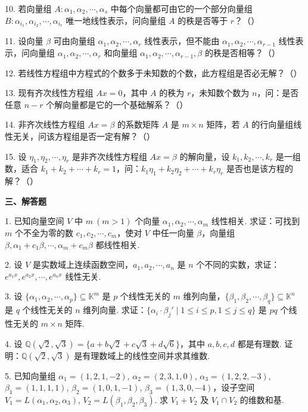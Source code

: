 \documentclass[UTF8,12pt,a4paper,fontset=fandol]{ctexart}
\begin{document}
10. 若向量组 $A:\alpha_1,\alpha_2,\cdots,\alpha_s$ 中每个向量都可由它的一个部分向量组 $B:\alpha_{i_1},\alpha_{i_2},\cdots,\alpha_{i_r}$ 唯一地线性表示，问向量组 $A$ 的秩是否等于 $r$？（\quad）

11. 设向量 $\beta$ 可由向量组 $\alpha_1,\alpha_2,\cdots,\alpha_r$ 线性表示，但不能由 $\alpha_1,\alpha_2,\cdots,\alpha_{r-1}$ 线性表示，问向量组 $\alpha_1,\alpha_2,\cdots,\alpha_r$ 和向量组 $\alpha_1,\alpha_2,\cdots,\alpha_{r-1},\beta$ 的秩是否相等？（\quad）

12. 若线性方程组中方程式的个数多于未知数的个数，此方程组是否必无解？（\quad）

13. 现有齐次线性方程组 $Ax=0$，其中 $A$ 的秩为 $r$，未知数个数为 $n$，问：是否任意 $n-r$ 个解向量都是它的一个基础解系？（\quad）

14. 非齐次线性方程组 $Ax=\beta$ 的系数矩阵 $A$ 是 $m\times n$ 矩阵，若 $A$ 的行向量组线性无关，问该方程组是否一定有解？（\quad）

15. 设 $\eta_1,\eta_2,\cdots,\eta_r$ 是非齐次线性方程组 $Ax=\beta$ 的解向量，设 $k_1,k_2,\cdots,k_r$ 是一组数，适合 $k_1+k_2+\cdots+k_r=1$，问：$k_1\eta_1+k_2\eta_2+\cdots+k_r\eta_r$ 是否也是该方程的解？（\quad）

\noindent\textbf{三、解答题}

1. 已知向量空间 $V$ 中 $m\ (m>1)$ 个向量 $\alpha_1,\alpha_2,\cdots,\alpha_m$ 线性相关. 求证：可找到 $m$ 个不全为零的数 $c_1,c_2,\cdots,c_m$，使对 $V$ 中任一向量 $\beta$，向量组 $\beta,\alpha_1+c_1\beta,\cdots,\alpha_m+c_m\beta$ 都线性相关.

2. 设 $V$ 是实数域上连续函数空间，$a_1,a_2,\cdots,a_n$ 是 $n$ 个不同的实数，求证：$e^{a_1x},e^{a_2x},\cdots,e^{a_nx}$ 线性无关.

3. 设 $\{\alpha_1,\alpha_2,\cdots,\alpha_p\}\subseteq\mathbb{K}^m$ 是 $p$ 个线性无关的 $m$ 维列向量，$\{\beta_1,\beta_2,\cdots,\beta_q\}\subseteq\mathbb{K}^n$ 是 $q$ 个线性无关的 $n$ 维列向量. 求证：$\{\alpha_i\cdot\beta_j'\mid 1\le i\le p,1\le j\le q\}$ 是 $pq$ 个线性无关的 $m\times n$ 矩阵.

4. 设 $\mathbb{Q}(\sqrt{2},\sqrt{3})=\{a+b\sqrt{2}+c\sqrt{3}+d\sqrt{6}\}$，其中 $a,b,c,d$ 都是有理数. 证明：$\mathbb{Q}(\sqrt{2},\sqrt{3})$ 是有理数域上的线性空间并求其维数.

5. 已知向量组 $\alpha_1=(1,2,1,-2)$, $\alpha_2=(2,3,1,0)$, $\alpha_3=(1,2,2,-3)$, $\beta_1=(1,1,1,1)$, $\beta_2=(1,0,1,-1)$, $\beta_3=(1,3,0,-4)$，设子空间 $V_1=L(\alpha_1,\alpha_2,\alpha_3)$, $V_2=L(\beta_1,\beta_2,\beta_3)$. 求 $V_1+V_2$ 及 $V_1\cap V_2$ 的维数和基.
\end{document}
